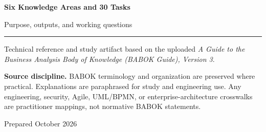 \documentclass[11pt]{article}
\begin{document}
\hypersetup{pageanchor=false}%
\begin{titlepage}
\centering
\vspace*{1.15in}
{\Huge\bfseries\color{BANavy} Six Knowledge Areas and 30 Tasks\par}
\vspace{0.35in}
{\Large\color{BAOrange} Purpose, outputs, and working questions\par}
\vspace{0.55in}
\rule{0.78\textwidth}{1.2pt}\par
\vspace{0.35in}
{\large Technical reference and study artifact based on the uploaded \emph{A Guide to the Business Analysis Body of Knowledge (BABOK Guide), Version 3}.\par}
\vfill
\begin{keybox}
\textbf{Source discipline.} BABOK terminology and organization are preserved where practical. Explanations are paraphrased for study and engineering use. Any engineering, security, Agile, UML/BPMN, or enterprise-architecture crosswalks are practitioner mappings, not normative BABOK statements.
\end{keybox}
\vspace{0.35in}
{\small Prepared October 2026\par}
\end{titlepage}\hypersetup{pageanchor=true}
\tableofcontents
\newpage
\end{document}
